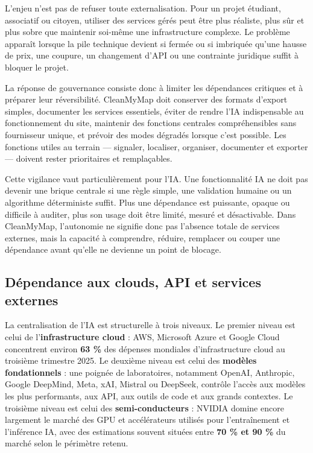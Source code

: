 \documentclass[
  10pt,
  a4paper,
  DIV=11,
  numbers=noendperiod,
  oneside]{scrreprt}
\let\oldtextbf\textbf
\renewcommand{\textbf}[1]{\oldtextbf{\textcolor{cmmnavy}{#1}}}
\begin{document}
L'enjeu n'est pas de refuser toute externalisation. Pour un projet
étudiant, associatif ou citoyen, utiliser des services gérés peut être
plus réaliste, plus sûr et plus sobre que maintenir soi-même une
infrastructure complexe. Le problème apparaît lorsque la pile technique
devient si fermée ou si imbriquée qu'une hausse de prix, une coupure, un
changement d'API ou une contrainte juridique suffit à bloquer le projet.

La réponse de gouvernance consiste donc à limiter les dépendances
critiques et à préparer leur réversibilité. CleanMyMap doit conserver
des formats d'export simples, documenter les services essentiels, éviter
de rendre l'IA indispensable au fonctionnement du site, maintenir des
fonctions centrales compréhensibles sans fournisseur unique, et prévoir
des modes dégradés lorsque c'est possible. Les fonctions utiles au
terrain --- signaler, localiser, organiser, documenter et exporter ---
doivent rester prioritaires et remplaçables.

Cette vigilance vaut particulièrement pour l'IA. Une fonctionnalité IA
ne doit pas devenir une brique centrale si une règle simple, une
validation humaine ou un algorithme déterministe suffit. Plus une
dépendance est puissante, opaque ou difficile à auditer, plus son usage
doit être limité, mesuré et désactivable. Dans CleanMyMap, l'autonomie
ne signifie donc pas l'absence totale de services externes, mais la
capacité à comprendre, réduire, remplacer ou couper une dépendance avant
qu'elle ne devienne un point de blocage.

\subsection{Dépendance aux clouds, API et services
externes}\label{duxe9pendance-aux-clouds-api-et-services-externes}

La centralisation de l'IA est structurelle à trois niveaux. Le premier
niveau est celui de l'\textbf{infrastructure cloud} : AWS, Microsoft
Azure et Google Cloud concentrent environ \textbf{63 \%} des dépenses
mondiales d'infrastructure cloud au troisième trimestre 2025. Le
deuxième niveau est celui des \textbf{modèles fondationnels} : une
poignée de laboratoires, notamment OpenAI, Anthropic, Google DeepMind,
Meta, xAI, Mistral ou DeepSeek, contrôle l'accès aux modèles les plus
performants, aux API, aux outils de code et aux grands contextes. Le
troisième niveau est celui des \textbf{semi-conducteurs} : NVIDIA domine
encore largement le marché des GPU et accélérateurs utilisés pour
l'entraînement et l'inférence IA, avec des estimations souvent situées
entre \textbf{70 \% et 90 \%} du marché selon le périmètre retenu.
\end{document}
